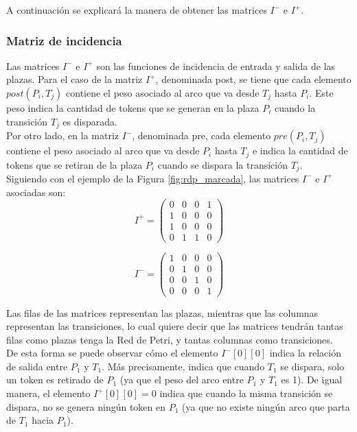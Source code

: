 A continuación se explicará la manera de obtener las matrices $I^-$ e $I^+$.

\subsubsection{Matriz de incidencia}
Las matrices $I^-$ e $I^+$ son las funciones de incidencia de entrada y salida de las plazas. Para el caso de la matriz $I^+$, denominada post, se tiene que cada elemento $post(P_i, T_j)$ contiene el peso asociado al arco que va desde $T_j$ hasta $P_i$. Este peso indica la cantidad de tokens que se generan en la plaza $P_i$ cuando la transición $T_j$ es disparada.\\

Por otro lado, en la matriz $I^-$, denominada pre, cada elemento $pre(P_i, T_j)$ contiene el peso asociado al arco que va desde $P_i$ hasta $T_j$ e indica la cantidad de tokens que se retiran de la plaza $P_i$ cuando se dispara la transición $T_j$.\\

Siguiendo con el ejemplo de la Figura \ref{fig:rdp_marcada}, las matrices $I^-$ e $I^+$ asociadas son:
\begin{equation}
I^+ =
    \begin{pmatrix}
        0 & 0 & 0 & 1\\
        1 & 0 & 0 & 0\\
        1 & 0 & 0 & 0\\
        0 & 1 & 1 & 0
    \end{pmatrix}
\end{equation}
    
\begin{equation}
I^- =
    \begin{pmatrix}
        1 & 0 & 0 & 0\\
        0 & 1 & 0 & 0\\
        0 & 0 & 1 & 0\\
        0 & 0 & 0 & 1
    \end{pmatrix}
\end{equation}

Las filas de las matrices representan las plazas, mientras que las columnas representan las transiciones, lo cual quiere decir que las matrices tendrán tantas filas como plazas tenga la Red de Petri, y tantas columnas como transiciones.\\

De esta forma se puede observar cómo el elemento $I^-[0][0]$ indica la relación de salida entre $P_1$ y $T_1$. Más precisamente, indica que cuando $T_1$ se dispara, solo un token es retirado de $P_1$ (ya que el peso del arco entre $P_1$ y $T_1$ es 1). De igual manera, el elemento $I^+[0][0] = 0$ indica que cuando la misma transición se dispara, no se genera ningún token en $P_1$ (ya que no existe ningún arco que parta de $T_1$ hacia $P_1$).\\

